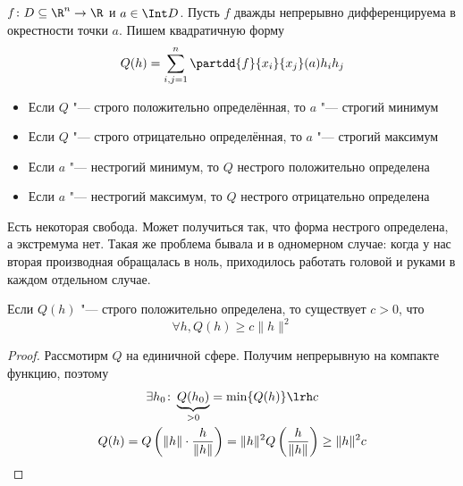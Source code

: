 \begin{theorem}
	$f \colon D \subseteq \R^n \to \R$ и $a \in \Int D$.
	Пусть $f$ дважды непрерывно дифференцируема в окрестности точки $a$.
	Пишем квадратичную форму
	\[
		Q(h) = \sum_{i,j=1}^n \partdd{f}{x_i}{x_j} (a) h_i h_j
	\]
	\begin{itemize}
	\item Если $Q$ "--- строго положительно определённая, то $a$ "--- строгий минимум
	\item Если $Q$ "--- строго отрицательно определённая, то $a$ "--- строгий максимум
	\item Если $a$ "--- нестрогий минимум, то $Q$ нестрого положительно определена
	\item Если $a$ "--- нестрогий максимум, то $Q$ нестрого отрицательно определена
	\end{itemize}
\end{theorem}
\begin{Rem}
	Есть некоторая свобода.
	Может получиться так, что форма нестрого определена, а экстремума нет.
	Такая же проблема бывала и в одномерном случае: когда у нас вторая производная обращалась в ноль,
	приходилось работать головой и руками в каждом отдельном случае.
\end{Rem}


\begin{lemma}
	Если $Q(h)$ "--- строго положительно определена, то существует $c > 0$, что
	\[ \forall h, Q(h) \ge c\|h\|^2 \]
\end{lemma}
\begin{proof}
	Рассмотирм $Q$ на единичной сфере. Получим непрерывную на компакте функцию, поэтому
	\begin{gather*}
		\exists h_0\colon \underbrace{Q(h_0)}_{>0} = \min \{Q(h)\} \lrh c \\
		Q(h) = Q\left(\|h\| \cdot \frac{h}{\|h\|}\right) = \|h\|^2 Q\left(\frac{h}{\|h\|}\right) \ge \|h\|^2 c
	\end{gather*}
\end{proof}

